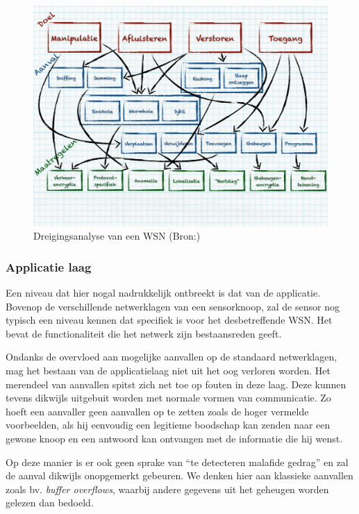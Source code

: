 \begin{figure}[ht]
  \centering
  \includegraphics[width=0.95\linewidth]{resources/wsn-threat-analysis.pdf}
  \caption[Dreigingsanalyse van een WSN]{Dreigingsanalyse van een WSN (Bron:\citep{aschenbruck2012security})}
  \label{fig:wsn-threat-analysis}
\end{figure}

\vspace{-5mm}

\subsubsection*{Applicatie laag}

Een niveau dat hier nogal nadrukkelijk ontbreekt is dat van de applicatie.
Bovenop de verschillende netwerklagen van een sensorknoop, zal de sensor nog
typisch een niveau kennen dat specifiek is voor het desbetreffende WSN. Het
bevat de functionaliteit die het netwerk zijn bestaansreden geeft.

Ondanks de overvloed aan mogelijke aanvallen op de standaard netwerklagen, mag
het bestaan van de applicatielaag niet uit het oog verloren worden. Het
merendeel van aanvallen spitst zich net toe op fouten in deze laag. Deze kunnen
tevens dikwijls uitgebuit worden met normale vormen van communicatie. Zo hoeft
een aanvaller geen aanvallen op te zetten zoals de hoger vermelde voorbeelden,
als hij eenvoudig een legitieme boodschap kan zenden naar een gewone knoop en
een antwoord kan ontvangen met de informatie die hij wenst.

Op deze manier is er ook geen sprake van ``te detecteren malafide gedrag'' en
zal de aanval dikwijls onopgemerkt gebeuren. We denken hier aan klassieke
aanvallen zoals bv. \emph{buffer overflows}, waarbij andere gegevens uit het
geheugen worden gelezen dan bedoeld.
